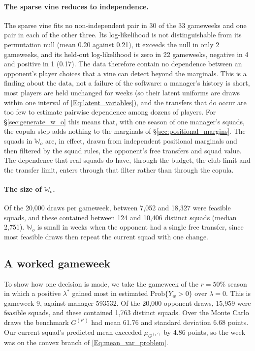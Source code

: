 \documentclass[12pt,oneside,a4paper]{book}
\theoremstyle{definition}
\theoremstyle{remark}
\begin{document}
	\paragraph{The sparse vine reduces to independence.} The sparse vine fits no non-independent
	pair in 30 of the 33 gameweeks and one pair in each of the other three. Its log-likelihood is
	not distinguishable from its permutation null (mean 0.20 against 0.21), it exceeds the null in
	only 2 gameweeks, and its held-out log-likelihood is zero in 22 gameweeks, negative in 4 and
	positive in 1 (0.17). The data therefore contain no dependence between an opponent's player
	choices that a vine can detect beyond the marginals. This is a finding about the data, not a
	failure of the software: a manager's history is short, most players are held unchanged for
	weeks (so their latent uniforms are draws within one interval of \eqref{Eq:latent_variables}), and the transfers that
	do occur are too few to estimate pairwise dependence among dozens of players. For \S\ref{sec:generate_w_o} this
	means that, with one season of one manager's squads, the copula step adds nothing to the
	marginals of \S\ref{sec:positional_margins}. The squads in $\mathbb{W}_o$ are, in effect, drawn from independent
	positional marginals and then filtered by the squad rules, the opponent's free transfers and
	squad value. The dependence that real squads do have, through the budget, the club limit and
	the transfer limit, enters through that filter rather than through the copula.

	\paragraph{The size of $\mathbb{W}_o$.} Of the 20{,}000 draws per gameweek, between 7{,}052 and
	18{,}327 were feasible squads, and these contained between 124 and 10{,}406 distinct squads
	(median 2{,}751). $\mathbb{W}_o$ is small in weeks when the opponent had a single free transfer,
	since most feasible draws then repeat the current squad with one change.

	\subsection{A worked gameweek}
	\label{sec:s2-worked}

	To show how one decision is made, we take the gameweek of the $r=50\%$ season in which a
	positive $\lambda^*$ gained most in estimated $\mathrm{Prob}\{Y_w>0\}$ over $\lambda=0$. This is
	gameweek 9, against manager 593532. Of the 20{,}000 opponent draws, 15{,}959 were feasible
	squads, and these contained 1{,}763 distinct squads. Over the Monte Carlo draws the benchmark
	$G^{(r')}$ had mean 61.76 and standard deviation 6.68 points. Our current squad's predicted
	mean exceeded $\mu_{G^{(r')}}$ by 4.86 points, so the week was on the convex branch of \eqref{Eq:mean_var_problem}.
\end{document}

